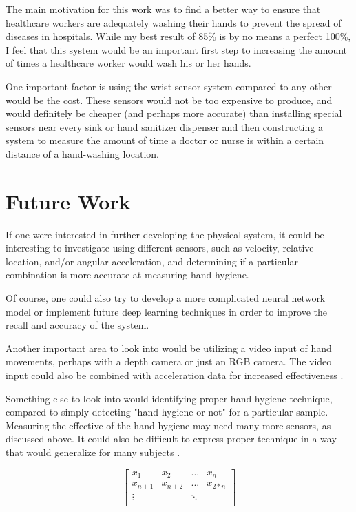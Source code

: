 \documentclass[]{report}
\begin{document}
The main motivation for this work was to find a better way to ensure that healthcare workers are adequately washing their hands to prevent the spread of diseases in hospitals. While my best result of 85\% is by no means a perfect 100\%, I feel that this system would be an important first step to increasing the amount of times a healthcare worker would wash his or her hands.

One important factor is using the wrist-sensor system compared to any other would be the cost. These sensors would not be too expensive to produce, and would definitely be cheaper (and perhaps more accurate) than installing special sensors near every sink or hand sanitizer dispenser and then constructing a system to measure the amount of time a doctor or nurse is within a certain distance of a hand-washing location.

\section{Future Work}

If one were interested in further developing the physical system, it could be interesting to investigate using different sensors, such as velocity, relative location, and/or angular acceleration, and determining if a particular combination is more accurate at measuring hand hygiene.

Of course, one could also try to develop a more complicated neural network model or implement future deep learning techniques in order to improve the recall and accuracy of the system.

Another important area to look into would be utilizing a video input of hand movements, perhaps with a depth camera or just an RGB camera. The video input could also be combined with acceleration data for increased effectiveness \cite{NNDL}.

Something else to look into would identifying proper hand hygiene technique, compared to simply detecting "hand hygiene or not" for a particular sample. Measuring the effective of the hand hygiene may need many more sensors, as discussed above. It could also be difficult to express proper technique in a way that would generalize for many subjects \cite{Neverova}.




$$
\left[
\begin{array}{cccc}
x_{1} & x_{2} & ... & x_{n} \\
x_{n+1} & x_{n+2} & ... & x_{2*n} \\
 \vdots & & \ddots & \\


\end{array}
\right]
$$






\end{document}
